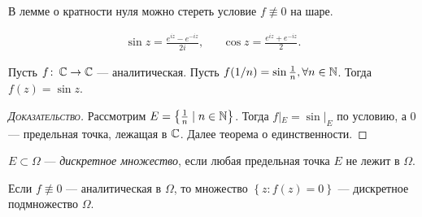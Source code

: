 \documentclass[../complex-analysis.tex]{subfiles}
\begin{document}
\begin{remrk}
 В лемме о кратности нуля можно стереть условие $ f \not\equiv 0 $ на шаре.
\end{remrk}
\begin{df}
 \begin{align*}
  \sin z = \frac{e^{iz} - e^{-iz}}{2i}, & & \cos z = \frac{e^{iz} + e^{-iz}}{2}.
 \end{align*} 
\end{df}
\begin{exmpl}
 Пусть $ f\colon\,\mathbb{C}\to\mathbb{C} $ --- аналитическая. Пусть $ f(1 / n) = \sin \frac{1}{n} , \forall n \in \mathbb{N}$. Тогда $ f(z) = \sin z $.
\end{exmpl}
\begin{proof}[\normalfont\textsc{Доказательство}]
 Рассмотрим $ E = \left\{ \frac{1}{n} \mid n \in \mathbb{N} \right\} $. Тогда $ f|_E = \sin|_E $ по условию, а $ 0 $ --- предельная точка, лежащая в $ \mathbb{C} $. Далее теорема о единственности.
\end{proof}

\begin{df}
 $ E \subset \Omega $ --- \textit{дискретное множество}, если любая предельная точка $ E $ не лежит в $ \Omega $.
\end{df}
\begin{crly}
 Если $ f \not\equiv 0 $ --- аналитическая в $ \Omega $, то множество $ \left\{ z \colon f(z) = 0 \right\} $ --- дискретное подмножество $ \Omega $.
\end{crly}
\end{document}
